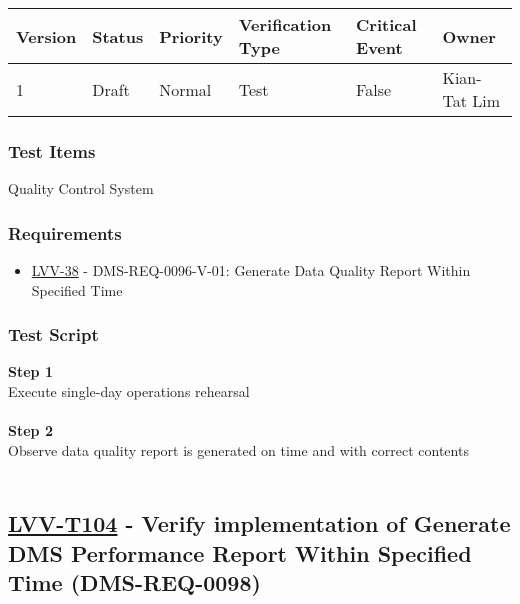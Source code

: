 \begin{longtable}[]{@{}llllll@{}}
\toprule
Version & Status & Priority & Verification Type & Critical Event &
Owner\tabularnewline
\midrule
\endhead
1 & Draft & Normal & Test & False & Kian-Tat Lim\tabularnewline
\bottomrule
\end{longtable}

\hypertarget{test-items-79}{%
\subsubsection{Test Items}\label{test-items-79}}

Quality Control System

\hypertarget{requirements-80}{%
\subsubsection{Requirements}\label{requirements-80}}

\begin{itemize}
\tightlist
\item
  \href{https://jira.lsstcorp.org/browse/LVV-38}{LVV-38} -
  DMS-REQ-0096-V-01: Generate Data Quality Report Within Specified Time
\end{itemize}

\hypertarget{test-script-80}{%
\subsubsection{Test Script}\label{test-script-80}}

\textbf{Step 1}\\
Execute single-day operations rehearsal\\
~\\
\textbf{Step 2}\\
Observe data quality report is generated on time and with correct
contents\\
~\\

\hypertarget{lvv-t104---verify-implementation-of-generate-dms-performance-report-within-specified-time-dms-req-0098}{%
\subsection{\texorpdfstring{\href{https://jira.lsstcorp.org/secure/Tests.jspa\#/testCase/LVV-T104}{LVV-T104}
- Verify implementation of Generate DMS Performance Report Within
Specified Time
(DMS-REQ-0098)}{LVV-T104 - Verify implementation of Generate DMS Performance Report Within Specified Time (DMS-REQ-0098)}}\label{lvv-t104---verify-implementation-of-generate-dms-performance-report-within-specified-time-dms-req-0098}}

